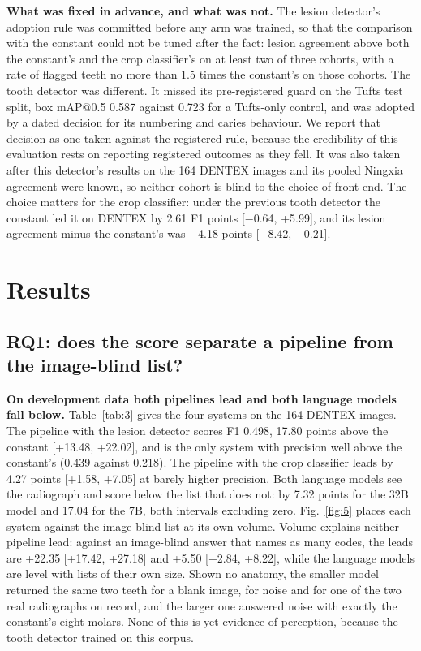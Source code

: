\documentclass[conference]{IEEEtran}
\begin{document}
\textbf{What was fixed in advance, and what was not.} The lesion detector's adoption rule was committed before any arm was trained, so that the comparison with the constant could not be tuned after the fact: lesion agreement above both the constant's and the crop classifier's on at least two of three cohorts, with a rate of flagged teeth no more than 1.5 times the constant's on those cohorts. The tooth detector was different. It missed its pre-registered guard on the Tufts test split, box mAP@0.5 0.587 against 0.723 for a Tufts-only control, and was adopted by a dated decision for its numbering and caries behaviour. We report that decision as one taken against the registered rule, because the credibility of this evaluation rests on reporting registered outcomes as they fell. It was also taken after this detector's results on the 164 DENTEX images and its pooled Ningxia agreement were known, so neither cohort is blind to the choice of front end. The choice matters for the crop classifier: under the previous tooth detector the constant led it on DENTEX by 2.61 F1 points [$-$0.64, +5.99], and its lesion agreement minus the constant's was $-$4.18 points [$-$8.42, $-$0.21].

\section{Results}

\subsection{RQ1: does the score separate a pipeline from the image-blind list?}

\textbf{On development data both pipelines lead and both language models fall below.} Table~\ref{tab:3} gives the four systems on the 164 DENTEX images. The pipeline with the lesion detector scores F1 0.498, 17.80 points above the constant [+13.48, +22.02], and is the only system with precision well above the constant's (0.439 against 0.218). The pipeline with the crop classifier leads by 4.27 points [+1.58, +7.05] at barely higher precision. Both language models see the radiograph and score below the list that does not: by 7.32 points for the 32B model and 17.04 for the 7B, both intervals excluding zero. Fig.~\ref{fig:5} places each system against the image-blind list at its own volume. Volume explains neither pipeline lead: against an image-blind answer that names as many codes, the leads are +22.35 [+17.42, +27.18] and +5.50 [+2.84, +8.22], while the language models are level with lists of their own size. Shown no anatomy, the smaller model returned the same two teeth for a blank image, for noise and for one of the two real radiographs on record, and the larger one answered noise with exactly the constant's eight molars. None of this is yet evidence of perception, because the tooth detector trained on this corpus.
\end{document}
